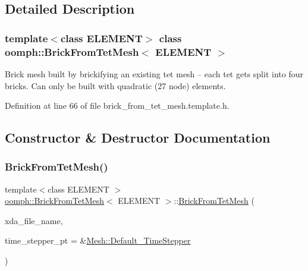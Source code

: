 \subsection{Detailed Description}
\subsubsection*{template$<$class E\+L\+E\+M\+E\+NT$>$\newline
class oomph\+::\+Brick\+From\+Tet\+Mesh$<$ E\+L\+E\+M\+E\+N\+T $>$}

Brick mesh built by brickifying an existing tet mesh -- each tet gets split into four bricks. Can only be built with quadratic (27 node) elements. 

Definition at line 66 of file brick\+\_\+from\+\_\+tet\+\_\+mesh.\+template.\+h.



\subsection{Constructor \& Destructor Documentation}
\mbox{\label{classoomph_1_1BrickFromTetMesh_abed00a445cc3c6b6cc00d32e0db4a366}} 
\subsubsection{\texorpdfstring{Brick\+From\+Tet\+Mesh()}{BrickFromTetMesh()}\hspace{0.1cm}{\footnotesize\ttfamily [1/3]}}
{\footnotesize\ttfamily template$<$class E\+L\+E\+M\+E\+NT $>$ \\
\hyperlink{classoomph_1_1BrickFromTetMesh}{oomph\+::\+Brick\+From\+Tet\+Mesh}$<$ E\+L\+E\+M\+E\+NT $>$\+::\hyperlink{classoomph_1_1BrickFromTetMesh}{Brick\+From\+Tet\+Mesh} (\begin{DoxyParamCaption}\item[{const std\+::string}]{xda\+\_\+file\+\_\+name,  }\item[{\hyperlink{classoomph_1_1TimeStepper}{Time\+Stepper} $\ast$}]{time\+\_\+stepper\+\_\+pt = {\ttfamily \&\hyperlink{classoomph_1_1Mesh_a12243d0fee2b1fcee729ee5a4777ea10}{Mesh\+::\+Default\+\_\+\+Time\+Stepper}} }\end{DoxyParamCaption})\hspace{0.3cm}{\ttfamily [inline]}}



